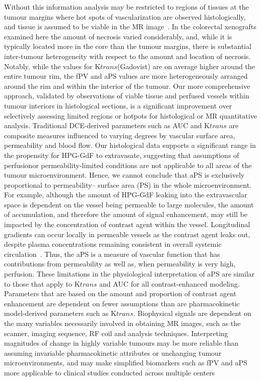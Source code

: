 Without this information analysis may be restricted to regions of tissues at the tumour margins where hot spots of vascularization are observed histologically, and tissue is assumed to be viable in the MR image~\cite{Pathak:2005gu,Li:2005gw}.
In the colorectal xenografts examined here the amount of necrosis varied considerably, and, while it is typically located more in the core than the tumour margins, there is substantial inter-tumour heterogeneity with respect to the amount and location of necrosis.
Notably, while the values for K${trans}$(Gadovist) are on average higher around the entire tumour rim, the fPV and aPS values are more heterogeneously arranged around the rim and within the interior of the tumour.
Our more comprehensive approach, validated by observations of viable tissue and perfused vessels within tumour interiors in histological sections, is a significant improvement over selectively assessing limited regions or hotpots for histological or MR quantitative analysis.
Traditional DCE-derived parameters such as AUC and K${trans}$ are composite measures influenced to varying degrees by vascular surface area, permeability and blood flow.
Our histological data supports a significant range in the propensity for HPG-GdF to extravasate, suggesting that assumptions of perfusionor permeability-limited conditions are not applicable to all areas of the tumour microenvironment.
Hence, we cannot conclude that aPS is exclusively proportional to permeability– surface area (PS) in the whole microenvironment.
For example, although the amount of HPG-GdF leaking into the extravascular space is dependent on the vessel being permeable to large molecules, the amount of accumulation, and therefore the amount of signal enhancement, may still be impacted by the concentration of contrast agent within the vessel.
Longitudinal gradients can occur locally in permeable vessels as the contrast agent leaks out, despite plasma concentrations remaining consistent in overall systemic circulation~\cite{Erickson:2003wt,Dewhirst:1999jh}.
Thus, the aPS is a measure of vascular function that has contributions from permeability as well as, when permeability is very high, perfusion.
These limitations in the physiological interpretation of aPS are similar to those that apply to K${trans}$ and AUC for all contrast-enhanced modeling.
Parameters that are based on the amount and proportion of contrast agent enhancement are dependent on fewer assumptions than are pharmacokinetic model-derived parameters such as K${trans}$.
Biophysical signals are dependent on the many variables necessarily involved in obtaining MR images, such as the scanner, imaging sequence, RF coil and analysis techniques.
Interpreting magnitudes of change in highly variable tumours may be more reliable than assuming invariable pharmacokinetic attributes or unchanging tumour microenvironments, and may make simplified biomarkers such as fPV and aPS more applicable to clinical studies conducted across multiple centers~\cite{OConnor:2012ie}


